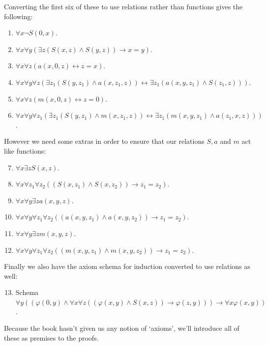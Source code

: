 \documentclass[10pt]{article}
\begin{document}
Converting the first six of these to use relations rather than functions gives the following:

\begin{enumerate}
\item $\forall x \neg S(0, x)$.
\item $\forall x \forall y (\exists z (S(x, z) \land S(y, z)) \to x = y)$.
\item $\forall x \forall z (a(x, 0, z) \leftrightarrow z = x)$.
\item $\forall x \forall y \forall z (\exists z_1 (S(y, z_1) \land a(x, z_1, z)) \leftrightarrow \exists z_1 (a(x, y, z_1) \land S(z_1, z)))$.
\item $\forall x \forall z (m(x, 0, z) \leftrightarrow z = 0)$.
\item $\forall x \forall y \forall z_1 (\exists z_1 (S(y, z_1) \land m(x, z_1, z)) \leftrightarrow \exists z_1 (m(x, y, z_1) \land a(z_1, x, z)))$.
\end{enumerate}

However we need some extras in order to ensure that our relations $S, a$ and $m$ act like functions:

\begin{enumerate}
\setcounter{enumi}{6}
\item $\forall x \exists z S(x, z)$.
\item $\forall x \forall z_1 \forall z_2 ((S(x, z_1) \land S(x, z_2)) \to z_1 = z_2)$.
\item $\forall x \forall y \exists z a(x, y, z)$.
\item $\forall x \forall y \forall z_1 \forall z_2 ((a(x, y, z_1) \land a(x, y, z_2)) \to z_1 = z_2)$.
\item $\forall x \forall y \exists z m(x, y, z)$.
\item $\forall x \forall y \forall z_1 \forall z_2 ((m(x, y, z_1) \land m(x, y, z_2)) \to z_1 = z_2)$.
\end{enumerate}

Finally we also have the axiom schema for induction converted to use relations as well:

\begin{enumerate}
\setcounter{enumi}{12}
\item Schema $\forall y ((\varphi (0, y) \land \forall x \forall z ((\varphi (x, y) \land S(x, z)) \to \varphi (z, y))) \to \forall x \varphi (x, y))$.
\end{enumerate}

Because the book hasn't given us any notion of `axioms', we'll introduce all of these as premises to the proofs.
\end{document}
